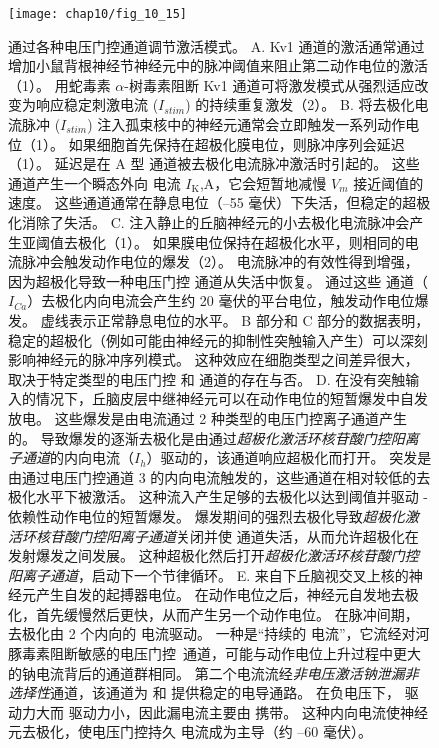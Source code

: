 \begin{figure}[htbp]
	\centering
	\texttt{[image: chap10/fig\_10\_15]}
	\caption{通过各种电压门控通道调节激活模式。
		A. Kv1 通道的激活通常通过增加小鼠背根神经节神经元中的脉冲阈值来阻止第二动作电位的激活（1）。
		用蛇毒素 $\alpha$-树毒素阻断 Kv1 通道可将激发模式从强烈适应改变为响应稳定刺激电流 ($I_{stim}$) 的持续重复激发（2）。
		B. 将去极化电流脉冲 ($I_{stim}$) 注入孤束核中的神经元通常会立即触发一系列动作电位（1）。
		如果细胞首先保持在超极化膜电位，则脉冲序列会延迟（1）。
		延迟是在 A 型  通道被去极化电流脉冲激活时引起的。
		这些通道产生一个瞬态外向  电流 $I_\text{K}$,A，它会短暂地减慢 $V_m$ 接近阈值的速度。
		这些通道通常在静息电位（–55 毫伏）下失活，但稳定的超极化消除了失活\cite{dekin1987vitro}。
		C. 注入静止的丘脑神经元的小去极化电流脉冲会产生亚阈值去极化（1）。
		如果膜电位保持在超极化水平，则相同的电流脉冲会触发动作电位的爆发（2）。
		电流脉冲的有效性得到增强，因为超极化导致一种电压门控  通道从失活中恢复。
		通过这些  通道（$I_{Ca}$）去极化内向电流会产生约 20 毫伏的平台电位，触发动作电位爆发。
		虚线表示正常静息电位的水平\cite{llinas1982electrophysiology}。
		B 部分和 C 部分的数据表明，稳定的超极化（例如可能由神经元的抑制性突触输入产生）可以深刻影响神经元的脉冲序列模式。
		这种效应在细胞类型之间差异很大，取决于特定类型的电压门控  和  通道的存在与否。
		D. 在没有突触输入的情况下，丘脑皮层中继神经元可以在动作电位的短暂爆发中自发放电。
		这些爆发是由电流通过 2 种类型的电压门控离子通道产生的。
		导致爆发的逐渐去极化是由通过\textit{超极化激活环核苷酸门控阳离子通道}的内向电流（$I_h$）驱动的，该通道响应超极化而打开。
		突发是由通过电压门控通道 3 的内向电流触发的，这些通道在相对较低的去极化水平下被激活。
		这种流入产生足够的去极化以达到阈值并驱动 - 依赖性动作电位的短暂爆发。
		爆发期间的强烈去极化导致\textit{超极化激活环核苷酸门控阳离子通道}关闭并使  通道失活，从而允许超极化在发射爆发之间发展。
		这种超极化然后打开\textit{超极化激活环核苷酸门控阳离子通道}，启动下一个节律循环\cite{mccormick1992model}。
		E. 来自下丘脑视交叉上核的神经元产生自发的起搏器电位。
		在动作电位之后，神经元自发地去极化，首先缓慢然后更快，从而产生另一个动作电位。
		在脉冲间期，去极化由 2 个内向的  电流驱动。
		一种是“持续的  电流”，它流经对河豚毒素阻断敏感的电压门控~通道，可能与动作电位上升过程中更大的钠电流背后的通道群相同。
		第二个电流流经\textit{非电压激活钠泄漏非选择性}通道，该通道为  和  提供稳定的电导通路。
		在负电压下， 驱动力大而  驱动力小，因此漏电流主要由  携带。
		这种内向电流使神经元去极化，使电压门控持久  电流成为主导（约 –60 毫伏）\cite{jackson2004mechanism}。}
	\label{fig:10_15}
\end{figure}


